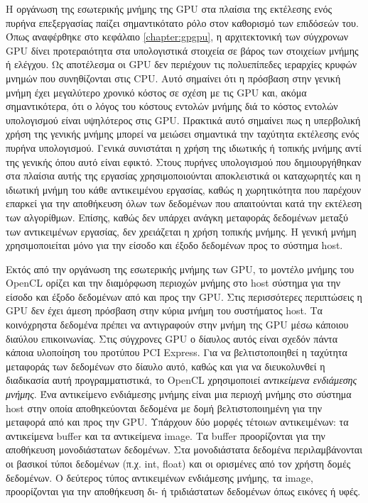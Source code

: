 \noindent Η οργάνωση της εσωτερικής μνήμης της GPU στα πλαίσια της εκτέλεσης ενός πυρήνα επεξεργασίας παίζει σημαντικότατο ρόλο στον καθορισμό των επιδόσεών του. Όπως αναφέρθηκε στο κεφάλαιο \ref{chapter:gpgpu}, η αρχιτεκτονική των σύγχρονων GPU δίνει προτεραιότητα  στα υπολογιστικά στοιχεία σε βάρος των στοιχείων μνήμης ή ελέγχου. Ως αποτέλεσμα οι GPU δεν περιέχουν τις πολυεπίπεδες ιεραρχίες κρυφών μνημών που συνηθίζονται στις CPU. Αυτό σημαίνει ότι η πρόσβαση στην γενική μνήμη έχει μεγαλύτερο χρονικό κόστος σε σχέση με τις GPU και, ακόμα σημαντικότερα, ότι ο λόγος του κόστους εντολών μνήμης διά το κόστος εντολών υπολογισμού είναι υψηλότερος στις GPU. Πρακτικά αυτό σημαίνει πως η υπερβολική χρήση της γενικής μνήμης μπορεί να μειώσει σημαντικά την ταχύτητα εκτέλεσης ενός πυρήνα υπολογισμού. Γενικά συνιστάται \cite{AMDIntro} η χρήση της ιδιωτικής ή τοπικής μνήμης αντί της γενικής όπου αυτό είναι εφικτό. Στους πυρήνες υπολογισμού που δημιουργήθηκαν στα πλαίσια αυτής της εργασίας χρησιμοποιούνται αποκλειστικά 
οι καταχωρητές και η ιδιωτική μνήμη του κάθε αντικειμένου εργασίας, καθώς η χωρητικότητα που παρέχουν επαρκεί για την αποθήκευση όλων των δεδομένων που απαιτούνται κατά την εκτέλεση των αλγορίθμων. Επίσης, καθώς δεν υπάρχει ανάγκη μεταφοράς δεδομένων μεταξύ των αντικειμένων εργασίας, δεν χρειάζεται η χρήση τοπικής μνήμης. Η γενική μνήμη χρησιμοποιείται μόνο για την είσοδο και έξοδο δεδομένων προς το σύστημα host.  

Εκτός από την οργάνωση της εσωτερικής μνήμης των GPU, το μοντέλο μνήμης του OpenCL ορίζει και την διαμόρφωση περιοχών μνήμης στο host σύστημα για την είσοδο και έξοδο δεδομένων από και προς την GPU. Στις περισσότερες περιπτώσεις η GPU δεν έχει άμεση πρόσβαση στην κύρια μνήμη του συστήματος host. Τα κοινόχρηστα δεδομένα πρέπει να αντιγραφούν στην μνήμη της GPU μέσω κάποιου διαύλου επικοινωνίας. Στις σύγχρονες GPU ο δίαυλος αυτός είναι σχεδόν πάντα κάποια υλοποίηση του προτύπου PCI Express. Για να βελτιστοποιηθεί η ταχύτητα μεταφοράς των δεδομένων στο δίαυλο αυτό, καθώς και για να διευκολυνθεί η διαδικασία αυτή προγραμματιστικά, το OpenCL χρησιμοποιεί \textit{αντικείμενα ενδιάμεσης μνήμης}. Ένα αντικείμενο ενδιάμεσης μνήμης είναι μια περιοχή μνήμης στο σύστημα host στην οποία αποθηκεύονται δεδομένα με δομή βελτιστοποιημένη για την μεταφορά από και προς την GPU. Υπάρχουν δύο μορφές τέτοιων αντικειμένων: τα αντικείμενα buffer και τα αντικείμενα image. Τα buffer προορίζονται για την αποθήκευση μονοδιάστατων 
δεδομένων. Στα μονοδιάστατα δεδομένα περιλαμβάνονται οι βασικοί τύποι δεδομένων (π.χ. int, float) και οι ορισμένες από τον χρήστη δομές δεδομένων. Ο δεύτερος τύπος αντικειμένων ενδιάμεσης μνήμης, τα image, προορίζονται για την αποθήκευση δι- ή τριδιάστατων δεδομένων όπως εικόνες ή υφές. 

